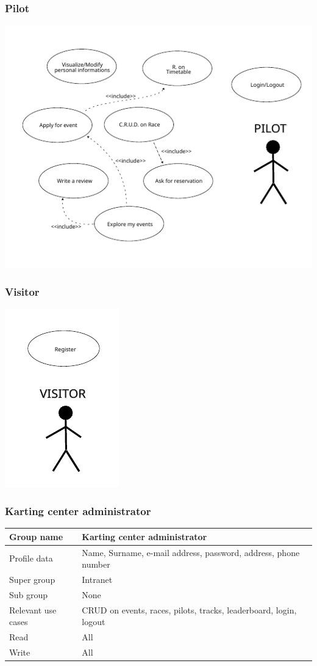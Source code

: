 \documentclass{beamer}
\begin{document}
\begin{frame}
    \frametitle{Pilot}
    \centering
    \includegraphics[width=0.9\linewidth]{drawings/uc-pilot.pdf}
\end{frame}

\begin{frame}
    \frametitle{Visitor}
    \centering
    \includegraphics[width=0.3\linewidth]{drawings/uc-visitor.pdf}
\end{frame}

\begin{frame}
\frametitle{Karting center administrator}

\begin{table}
    \tiny
    \begin{tabular}{|p{2cm}|p{6cm}|}
    \hline
    Group name & \textbf{Karting center administrator} \\
    \hline
    Profile data & Name, Surname, e-mail address, password, address, phone number \\
    \hline
    Super group & Intranet \\
    \hline
    Sub group & None \\
    \hline
    Relevant use cases & CRUD on events, races, pilots, tracks, leaderboard, 
    login, logout \\
    \hline
    Read & All \\
    \hline
    Write & All \\
    \hline
    \end{tabular}
    \end{table}

\end{frame}
\end{document}
